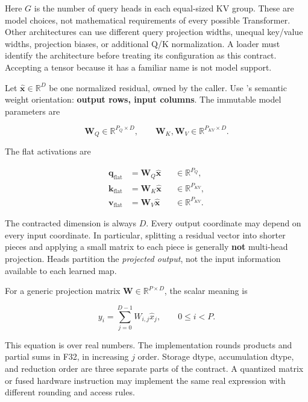 Here \(G\) is the number of query heads in each equal-sized KV group.
These are model choices, not mathematical requirements of every possible
Transformer. Other architectures can use different query projection
widths, unequal key/value widths, projection biases, or additional Q/K
normalization. A loader must identify the architecture before treating
its configuration as this contract. Accepting a tensor because it has a
familiar name is not model support.

Let \(\widehat{\mathbf{x}}\in\mathbb{R}^{D}\) be one normalized
residual, owned by the caller. Use 's semantic weight
orientation: \textbf{output rows, input columns}. The immutable model
parameters are

\begin{equation}
\mathbf{W}_Q\in\mathbb{R}^{P_Q\times D},\qquad
\mathbf{W}_K,\mathbf{W}_V\in\mathbb{R}^{P_{KV}\times D}.
\end{equation}

The flat activations are

\begin{equation}
\begin{aligned}
\mathbf{q}_{\mathrm{flat}}&=\mathbf{W}_Q\widehat{\mathbf{x}}
    &&\in\mathbb{R}^{P_Q},\\
\mathbf{k}_{\mathrm{flat}}&=\mathbf{W}_K\widehat{\mathbf{x}}
    &&\in\mathbb{R}^{P_{KV}},\\
\mathbf{v}_{\mathrm{flat}}&=\mathbf{W}_V\widehat{\mathbf{x}}
    &&\in\mathbb{R}^{P_{KV}}.
\end{aligned}
\end{equation}

The contracted dimension is always \(D\). Every output coordinate may
depend on every input coordinate. In particular, splitting a residual
vector into shorter pieces and applying a small matrix to each piece is
generally \textbf{not} multi-head projection. Heads partition the
\emph{projected output}, not the input information available to each
learned map.

For a generic projection matrix \(\mathbf{W}\in\mathbb{R}^{P\times D}\),
the scalar meaning is

\begin{equation}
y_i=\sum_{j=0}^{D-1}W_{i,j}\widehat{x}_j,
\qquad 0\le i<P.
\end{equation}

This equation is over real numbers. The implementation rounds products
and partial sums in F32, in increasing \(j\) order. Storage dtype,
accumulation dtype, and reduction order are three separate parts of the
contract. A quantized matrix or fused hardware instruction may implement
the same real expression with different rounding and access rules.

